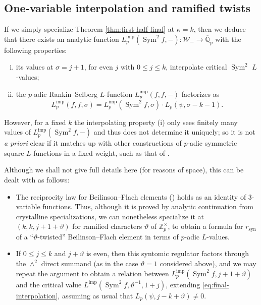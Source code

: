 \documentclass[11pt, a4paper, reqno]{amsart}
\theoremstyle{definition}
\theoremstyle{plain}
\theoremstyle{remark}
\DeclareMathOperator{\Sym}{Sym}
\DeclareMathOperator{\syn}{syn}
\newcommand{\numberset}{\mathbb}
\newcommand{\Q}{\numberset{Q}}
\newcommand{\Z}{\numberset{Z}}
\renewcommand{\theta}{\vartheta}
\newcommand{\Weight}{\mathcal{W}}
\newcommand{\Limp}{L^{\mathrm{imp}}}
\renewcommand{\le}{\leqslant}
\begin{document}
 \subsection{One-variable interpolation and ramified twists}

  If we simply specialize Theorem \ref{thm:first-half-final} at $\kappa = k$, then we deduce that there exists an analytic function $\Limp_p(\Sym^2 f, -) : \Weight_- \to \overline{\Q}_p$ with the following properties:
  \begin{enumerate}[(i)]
   \item its values at $\sigma = j + 1$, for even $j$ with $0 \le j \le k$, interpolate critical $\Sym^2$ $L$-values;
   \item the $p$-adic Rankin--Selberg $L$-function $\Limp_p(f, f, -)$ factorizes as
   \[ \Limp_p(f, f, \sigma) = \Limp_p(\Sym^2 f, \sigma) \cdot L_p(\psi, \sigma - k - 1).\]
  \end{enumerate}

  However, for a fixed $k$ the interpolating property (i) only sees finitely many values of $\Limp_p(\Sym^2 f, -)$ and thus does not determine it uniquely; so it is not \emph{a priori} clear if it matches up with other constructions of $p$-adic symmetric square $L$-functions in a fixed weight, such as that of \cite{dabrowskidelbourgo97}.

  Although we shall not give full details here (for reasons of space), this can be dealt with as follows:
  \begin{itemize}
   \item The reciprocity law for Beilinson--Flach elements (\cite{KLZ20, loefflerzerbes16}) holds as an identity of 3-variable functions. Thus, although it is proved by analytic continuation from crystalline specializations, we can nonetheless specialize it at $(k, k, j + 1 + \theta)$ for ramified characters $\theta$ of $\Z_p^\times$, to obtain a formula for $r_{\syn}$ of a ``$\theta$-twisted'' Beilinson--Flach element in terms of $p$-adic $L$-values.

   \item If $0 \le j \le k$ and $j + \theta$ is even, then this syntomic regulator factors through the $\wedge^2$ direct summand (as in the case $\theta = 1$ considered above), and we may repeat the argument to obtain a relation between $\Limp_p(\Sym^2 f, j + 1 + \theta)$ and the critical value $\Limp(\Sym^2 f, \theta^{-1}, 1 + j)$, extending \eqref{eq:final-interpolation}, assuming as usual that $L_p(\psi, j -k + \theta) \ne 0$.
  \end{itemize}
\end{document}
